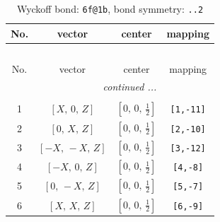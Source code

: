 \documentclass[fleqn,8pt]{jsarticle}
\begin{document}
\begin{longtable}{cccc}
\caption{Wyckoff bond: {\tt 6f@1b}, bond symmetry: {\tt ..2}}
 \\
 \hline \hline
No. & vector & center & mapping \\ \hline \endfirsthead

\multicolumn{3}{l}{\tablename\ \thetable{}} \\
 \hline \hline
No. & vector & center & mapping \\ \hline \endhead

 \hline \hline
\multicolumn{3}{r}{\footnotesize\it continued ...} \\ \endfoot

 \hline \hline
\multicolumn{3}{r}{} \\ \endlastfoot

1 & $\left[ X,\, 0,\, Z \right]$ & $\left[ 0,\, 0,\, \frac{1}{2} \right]$ & {\tt [1,-11]} \\ \hline
2 & $\left[ 0,\, X,\, Z \right]$ & $\left[ 0,\, 0,\, \frac{1}{2} \right]$ & {\tt [2,-10]} \\ \hline
3 & $\left[ - X,\, - X,\, Z \right]$ & $\left[ 0,\, 0,\, \frac{1}{2} \right]$ & {\tt [3,-12]} \\ \hline
4 & $\left[ - X,\, 0,\, Z \right]$ & $\left[ 0,\, 0,\, \frac{1}{2} \right]$ & {\tt [4,-8]} \\ \hline
5 & $\left[ 0,\, - X,\, Z \right]$ & $\left[ 0,\, 0,\, \frac{1}{2} \right]$ & {\tt [5,-7]} \\ \hline
6 & $\left[ X,\, X,\, Z \right]$ & $\left[ 0,\, 0,\, \frac{1}{2} \right]$ & {\tt [6,-9]} \\
\end{longtable}
\renewcommand{\arraystretch}{1.2}
\end{document}
